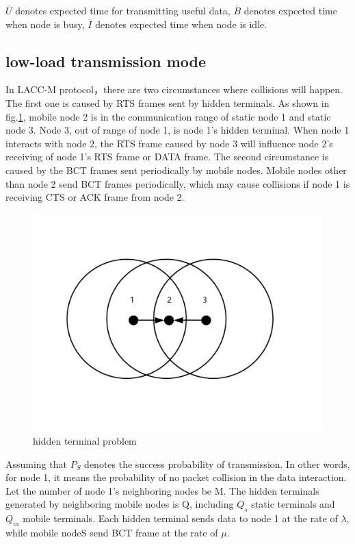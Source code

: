 \documentclass[conference]{IEEEtran}
\begin{document}
$\overline U$ denotes expected time for transmitting useful data, $\overline B$ denotes expected time when node is busy, $\overline I$ denotes expected time when node is idle. 

\subsection {low-load transmission mode}
In LACC-M protocol，there are two circumstances where collisions will happen. The first one is caused by RTS frames sent by hidden terminals. As shown in fig.\ref{fig:example}, mobile node 2 is in the communication range of static node 1 and static node 3. Node 3, out of range of node 1, is node 1's hidden terminal. When node 1 interacts with node 2, the RTS frame caused by node 3 will influence node 2's receiving of node 1's RTS frame or DATA frame. The second circumstance is caused by the BCT frames sent periodically by mobile nodes. Mobile nodes other than node 2 send BCT frames periodically, which may cause collisions if node 1 is receiving CTS or ACK frame from node 2.
\begin{figure}[!ht]
	\centering
	\includegraphics[scale=0.1]{figures/hidden.pdf}
	\caption{
		hidden terminal problem
	}
	\label{fig:example}
\end{figure}

Assuming that $P_S$ denotes the success probability of transmission. In other words, for node 1, it means the probability of no packet collision in the data interaction. Let the number of node 1's neighboring nodes be M. The hidden terminals generated by neighboring mobile nodes is Q, including $Q_s$ static terminals and $Q_m$ mobile terminals. Each hidden terminal sends data to node 1 at the rate of $\lambda$, while mobile nodeS send BCT frame at the rate of $\mu$. 
\end{document}
